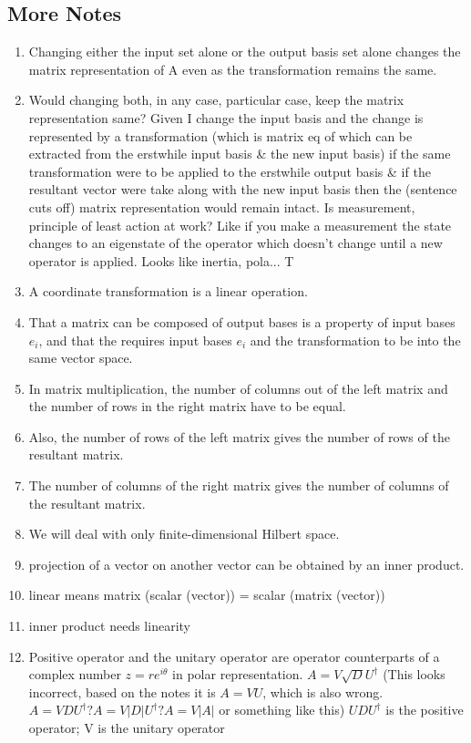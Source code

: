 \documentclass{article}
\begin{document}
\subsection{More Notes}

    \begin{enumerate}
    
    \item Changing either the input set alone or the output basis set alone changes the matrix representation of A even as the transformation remains the same. 
    \item Would changing both, in any case, particular case, keep the matrix representation same? Given I change the input basis and the change is represented by a transformation (which is matrix eq of which can be extracted from the erstwhile input basis \& the new input basis) if the same transformation were to be applied to the erstwhile output basis \& if the resultant vector were take along with the new input basis then the (sentence cuts off) matrix representation would remain intact.
Is measurement, principle of least action at work? Like if you make a measurement the state changes to an eigenstate of the operator which doesn't change until a new operator is applied. Looks like inertia, pola... 
T
    
    \item A coordinate transformation is a linear operation.
    \item That a matrix can be composed of output bases is a property of input bases $e_i$, and that the requires input bases $e_i$ and the transformation to be into the same vector space.
    
    
    
    \item In matrix multiplication, the number of columns out of the left matrix and the number of rows in the right matrix have to be equal.
    \item Also, the number of rows of the left matrix gives the number of rows of the resultant matrix.
    \item The number of columns of the right matrix gives the number of columns of the resultant matrix.

    
    \item We will deal with only finite-dimensional Hilbert space.
    \item projection of a vector on another vector can be obtained by an inner product. 
    \item linear means matrix (scalar (vector)) = scalar (matrix (vector))
    \item inner product needs linearity 
    \item Positive operator and the unitary operator are operator counterparts of a complex number $z = re^{i\theta}$ in polar representation. $A=V\sqrt{D}U^\dagger$ (This looks incorrect, based on the notes it is $A=VU$, which is also wrong. $A = V D U^\dagger? A=V|D|U^\dagger? A = V|A|$ or something like this) $UDU^\dagger$ is the positive operator; V is the unitary operator

    \end{enumerate}
    
\end{document}
